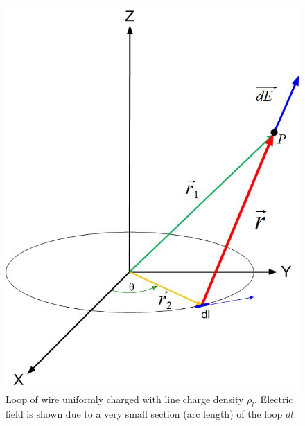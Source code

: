 \documentclass{ximera}
\begin{document}
\begin{figure}[h!]
\begin{center}
\includegraphics[scale=0.5]{../jpg/Charge_Distributionanypoint.jpg}
\caption{\label{fig:loopSinglePt}Loop of wire uniformly charged with line charge density $\rho_l$. Electric field is shown due to a very small section (arc length) of the loop $dl$.}
\end{center}
\end{figure}
\end{document}
